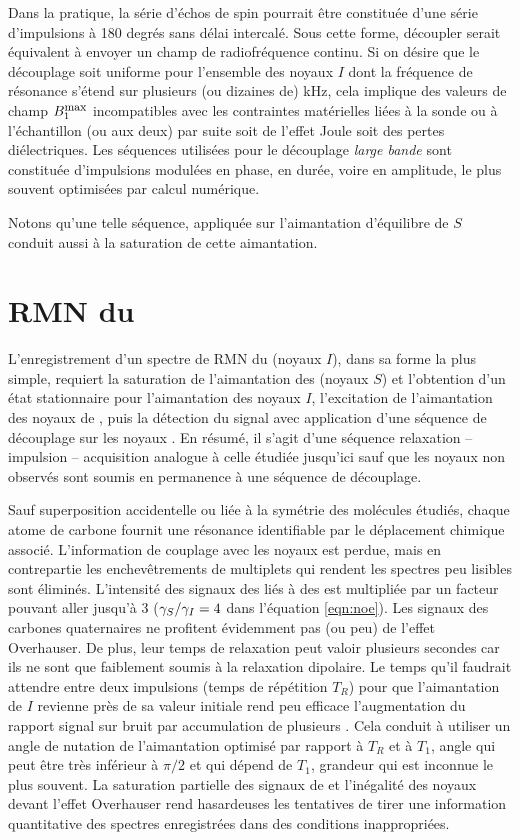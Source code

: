 Dans la pratique, la série d'échos de spin pourrait être constituée d'une 
série d'impulsions à 180 degrés sans délai intercalé. 
Sous cette forme, découpler serait équivalent à envoyer
un champ de radiofréquence continu. Si on désire que le découplage soit uniforme
pour l'ensemble des noyaux $I$ dont la fréquence de résonance s'étend
sur plusieurs (ou dizaines de) kHz, cela implique des valeurs de champ 
$B_1^{\mbox{\footnotesize{max}}}$ incompatibles avec les contraintes matérielles liées à la sonde 
ou à l'échantillon (ou aux deux) par suite soit de l'effet Joule
soit des pertes diélectriques.
Les séquences utilisées pour le découplage \emph{large bande}
sont constituée d'impulsions modulées en phase, en durée, voire en amplitude,
le plus souvent optimisées par calcul numérique.

Notons qu'une telle séquence, appliquée sur l'aimantation d'équilibre de $S$
conduit aussi à la saturation de cette aimantation.

\section{RMN du \carb}
L'enregistrement d'un spectre de RMN du \carb (noyaux $I$), 
dans sa forme la plus simple, requiert la saturation de l'aimantation des \prot
(noyaux $S$) et l'obtention d'un état stationnaire pour l'aimantation des noyaux $I$,
l'excitation de l'aimantation des noyaux de \carb, puis la détection du signal
avec application d'une séquence de découplage sur les noyaux \prot.
En résumé, il s'agit d'une séquence relaxation -- impulsion -- acquisition analogue
à celle étudiée jusqu'ici sauf que les noyaux non observés sont soumis en permanence
à une séquence de découplage.

Sauf superposition accidentelle ou liée à la symétrie des molécules étudiés, chaque
atome de carbone fournit une résonance identifiable par le déplacement chimique associé.
L'information de couplage avec les noyaux \prot est perdue, mais en contrepartie
les enchevêtrements de multiplets qui rendent les spectres peu lisibles sont éliminés.
L'intensité des signaux des \carb liés à des \prot est multipliée par un facteur pouvant aller
jusqu'à 3 ($\gamma_S/\gamma_I = 4$ dans l'équation \ref{eqn:noe}).
Les signaux des carbones quaternaires ne profitent évidemment pas (ou peu) de l'effet Overhauser.
De plus, leur temps de relaxation peut valoir plusieurs secondes car ils ne sont
que faiblement soumis à la relaxation dipolaire.
Le temps qu'il faudrait attendre entre deux impulsions (temps de répétition $T_R$)
pour que l'aimantation de $I$
revienne près de sa valeur initiale rend peu efficace l'augmentation du rapport 
signal sur bruit par accumulation de plusieurs \FID.
Cela conduit à utiliser un angle de nutation de l'aimantation optimisé par rapport 
à $T_R$ et à $T_1$, angle qui peut être très inférieur à $\pi/2$ et
qui dépend de $T_1$, grandeur qui est inconnue le plus souvent.
La saturation partielle des signaux de \carb et l'inégalité des noyaux devant
l'effet Overhauser rend hasardeuses les tentatives de tirer une information quantitative
des spectres enregistrées dans des conditions inappropriées.

